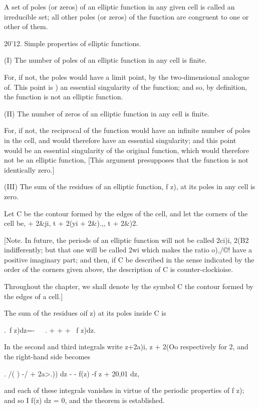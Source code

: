 A set of poles (or zeros) of an elliptic function in any given cell is
called an irreducible set; all other poles (or zeros) of the function
are congruent to one or other of them.

%
%

20'12. Simple properties of elliptic functions.

(I) The number of poles of an elliptic function in any cell is finite.

For, if not, the poles would have a limit point, by the
two-dimensional analogue of. This point is ) an
essential singularity of the function; and so, by definition, the
function is not an elliptic function.

(II) The number of zeros of an elliptic function in any cell is
finite.

For, if not, the reciprocal of the function would have an infinite
number of poles in the cell, and would therefore have an essential
singularity; and this point would be an essential singularity of the
original function, which would therefore not be an elliptic function,
[This argument presupposes that the function is not identically zero.]

(III) The sum of the residues of an elliptic function, f z), at its
poles in any cell is zero.

Let C be the contour formed by the edges of the cell, and let the
corners of the cell be, + 2\&ji, t + 2(yi + 2\&).,, t + 2\&)2.

[Note. In future, the periods of an elliptic function will not be
called 2ci)i, 2(B2 indifferently; but that one will be called 2wi
which makes the ratio o),/©! have a positive imaginary part; and
then, if C be described in the sense indicated by the order of the
corners given above, the description of C is counter-clockioise.

Throughout the chapter, we shall denote by the symbol C the contour
formed by the edges of a cell.]

The sum of the residues oif z) at its poles inside C is

 .\ f z)dz=-~\ \ . + + + \ f z)dz.

In the second and third integrals write z+2a)i, z + 2(Oo respectively
for 2, and the right-hand side becomes

 . /( ) -/ + 2a>.)) dz - - f(z) -f z + 20,01 dz,

and each of these integrals vanishes in virtue of the periodic
properties of f z); and so I f(z) dz = 0, and the theorem is
established.

